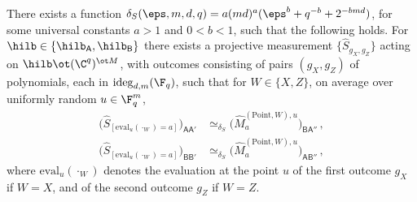 \begin{lemma}
	\label{lem:qld-4-7}
	\leanok
	There exists a function
	$\delta_S(\eps,m,d,q) = a(md)^a(\eps^b + q^{-b} + 2^{-bmd})$, for some
	universal constants $a > 1$ and $0 < b < 1$, such that the following
	holds. For
	$\hilb \in \{\hilb_{\mathsf{A}}, \hilb_{\mathsf{B}}\}$ there
	exists a projective measurement $\{\hat{S}_{g_X,g_Z}\}$ acting on
	$\hilb \ot (\C^q)^{\ot M}$, with outcomes consisting of pairs
	$(g_X, g_Z)$ of polynomials, each in $\mathrm{ideg}_{d,m}(\F_q)$, such
	that for $W \in \{X, Z\}$, on average over uniformly random
	$u \in \F_q^m$,
	\begin{align}
		\big(\hat{S}_{[\mathrm{eval}_u(\cdot_W) = a]}
		\big)_{\mathsf{A}\mathsf{A}'}
		&\simeq_{\delta_S}
		\big(\hat{M}^{(\mathrm{Point},W),u}_{a}
		\big)_{\mathsf{B}\mathsf{A}''}\,,
		\label{eq:qld-s-point-con-alice} \\
		\big(\hat{S}_{[\mathrm{eval}_u(\cdot_W) = a]}
		\big)_{\mathsf{B}\mathsf{B}'}
		&\simeq_{\delta_S}
		\big(\hat{M}^{(\mathrm{Point},W),u}_{a}
		\big)_{\mathsf{A}\mathsf{B}''}\,,
		\label{eq:qld-s-point-con-bob}
	\end{align}
	where $\mathrm{eval}_u(\cdot_W)$ denotes the evaluation at the point $u$
	of the first outcome $g_X$ if $W = X$, and of the second outcome $g_Z$
	if $W = Z$.
\end{lemma}
